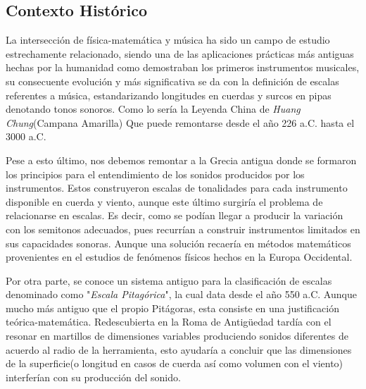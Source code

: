 \documentclass{book}
\begin{document}
	\subsection*{Contexto Histórico}
	La intersección de física-matemática y música ha sido un campo de estudio estrechamente relacionado, siendo una de las aplicaciones prácticas más antiguas hechas por la humanidad como demostraban los primeros instrumentos musicales, su consecuente evolución y más significativa se da con la definición de escalas referentes a música, estandarizando longitudes en cuerdas y surcos en pipas denotando tonos sonoros. Como lo sería la Leyenda China de \emph{Huang Chung}(Campana Amarilla) Que puede remontarse desde el año 226 a.C. hasta el 3000 a.C.\citep[p.~9]{physicsmusiccolor}\par
	
	Pese a esto último, nos debemos remontar a la Grecia antigua donde se formaron los principios para el entendimiento de los sonidos producidos por los instrumentos. Estos construyeron escalas de tonalidades para cada instrumento disponible en cuerda y viento, aunque este último surgiría el problema de relacionarse en escalas. Es decir, como se podían llegar a producir la variación con los semitonos adecuados, pues recurrían a construir instrumentos limitados en sus capacidades sonoras. Aunque una solución recaería en métodos matemáticos provenientes en el estudios de fenómenos físicos hechos en la Europa Occidental.~\citep[p.~9]{musichistory}\par
	
	Por otra parte, se conoce un sistema antiguo para la clasificación de escalas denominado como "\emph{Escala Pitagórica}", la cual data desde el año 550 a.C. Aunque mucho más antiguo que el propio Pitágoras, esta consiste en una justificación teórica-matemática. Redescubierta en la Roma de Antigüedad tardía con el resonar en martillos de dimensiones variables produciendo sonidos diferentes de acuerdo al radio de la herramienta, esto ayudaría a concluir que las dimensiones de la superficie(o longitud en casos de cuerda así como volumen con el viento) interferían con su producción del sonido.~\citep[p.~10]{musichistory}\par
	
\end{document}
